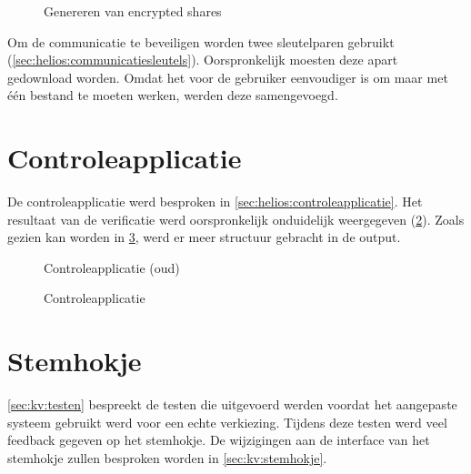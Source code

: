 \begin{figure}
  \caption{Genereren van encrypted shares}
  \label{fig:ui:trustees_home_encrypted_shares}
\end{figure}

\npar Om de communicatie te beveiligen worden twee sleutelparen gebruikt (\ref{sec:helios:communicatiesleutels}). Oorspronkelijk moesten deze apart gedownload worden. Omdat het voor de gebruiker eenvoudiger is om maar met \'e\'en bestand te moeten werken, werden deze samengevoegd.

\section{Controleapplicatie}
\label{sec:ui:controleapplicatie}

De controleapplicatie werd besproken in \ref{sec:helios:controleapplicatie}. Het resultaat van de verificatie werd oorspronkelijk onduidelijk weergegeven  (\ref{fig:ui:verifier_old}). Zoals gezien kan worden in \ref{fig:ui:verifier}, werd er meer structuur gebracht in de output.

\begin{figure}
  \caption{Controleapplicatie (oud)}
  \label{fig:ui:verifier_old}
\end{figure}

\begin{figure}
  \caption{Controleapplicatie}
  \label{fig:ui:verifier}
\end{figure}

\section{Stemhokje}
\label{sec:ui:stemhokje}

\ref{sec:kv:testen} bespreekt de testen die uitgevoerd werden voordat het aangepaste systeem gebruikt werd voor een echte verkiezing. Tijdens deze testen werd veel feedback gegeven op het stemhokje. De wijzigingen aan de interface van het stemhokje zullen besproken worden in \ref{sec:kv:stemhokje}.
